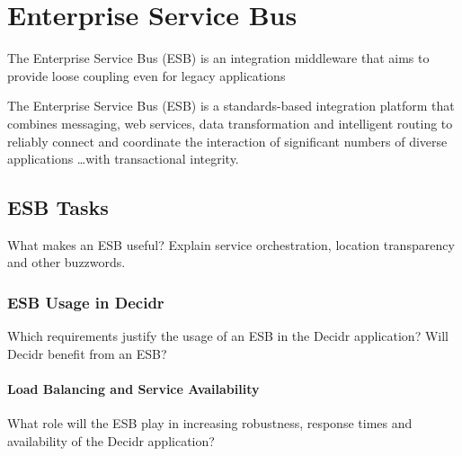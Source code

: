 %
%

\chapter{Enterprise Service Bus}
\label{chap:enterprise-service-bus}


The Enterprise Service Bus (ESB) is an integration middleware that aims to
provide loose coupling even for legacy applications


The Enterprise Service Bus (ESB) is a standards-based integration platform that
combines messaging, web services, data transformation and intelligent routing to
reliably connect and coordinate the interaction of significant numbers of diverse
applications \ldots with transactional integrity.\cite{chappell}

\section{ESB Tasks}
\label{sec:esb-tasks}
What makes an ESB useful? Explain service orchestration, location transparency
and other buzzwords.

\subsection{ESB Usage in Decidr}
\label{subsec:esb-usage-in-decidr}
Which requirements justify the usage of an ESB in the Decidr application? 
Will Decidr benefit from an ESB?

\subsubsection{Load Balancing and Service Availability}
\label{subsubsec:load-balancing-and-service-availability}
What role will the ESB play in increasing robustness, response times and
availability of the Decidr application?

